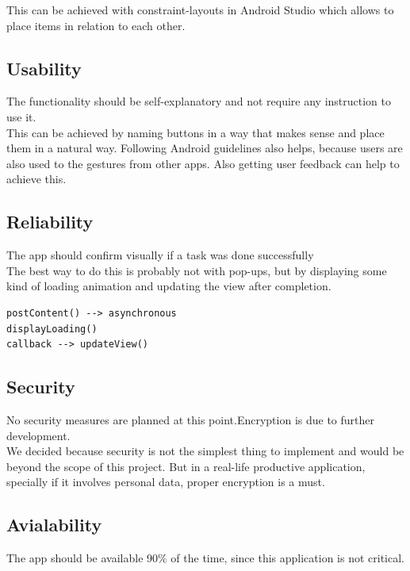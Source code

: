 \documentclass[conference]{IEEEtran}
\numberwithin{figure}{subsection}
\begin{document}
This can be achieved with constraint-layouts in Android Studio which allows to place items in relation to each other.\\


\subsection{Usability}
The  functionality  should  be  self-explanatory and not require any instruction to use it.\\

This can be achieved by naming buttons in a way that makes sense and place them in a natural way. Following Android guidelines also helps, because users are also used to the gestures from other apps. Also getting user feedback can help to achieve this.\\


\subsection{Reliability}
The  app  should  confirm  visually  if  a  task was done successfully\\

The best way to do this is probably not with pop-ups, but by displaying some kind of loading animation and updating the view after completion.

\begin{lstlisting}
postContent() --> asynchronous
displayLoading()
callback --> updateView()
\end{lstlisting}


\subsection{Security}
No security measures are planned at this point.Encryption is due to further development.\\

We decided because security is not the simplest thing to implement and would be beyond the scope of this project. But in a real-life productive application, specially if it involves personal data, proper encryption is a must.\\


\subsection{Avialability}
The  app  should  be  available  90\%  of  the time, since this application is not critical.\\
\end{document}
